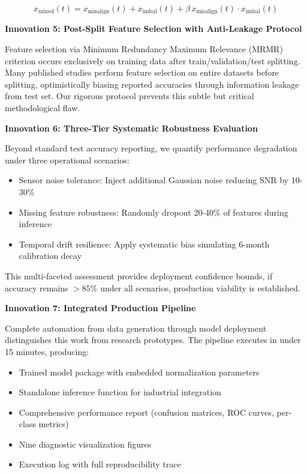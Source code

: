 \documentclass[11pt,a4paper]{article}
\begin{document}
\begin{equation}
x_{\text{mixed}}(t) = x_{\text{misalign}}(t) + x_{\text{imbal}}(t) + \beta \, x_{\text{misalign}}(t) \cdot x_{\text{imbal}}(t)
\end{equation}

\textbf{Innovation 5: Post-Split Feature Selection with Anti-Leakage Protocol}

Feature selection via Minimum Redundancy Maximum Relevance (MRMR) criterion occurs exclusively on training data after train/validation/test splitting. Many published studies perform feature selection on entire datasets before splitting, optimistically biasing reported accuracies through information leakage from test set. Our rigorous protocol prevents this subtle but critical methodological flaw.

\textbf{Innovation 6: Three-Tier Systematic Robustness Evaluation}

Beyond standard test accuracy reporting, we quantify performance degradation under three operational scenarios:
\begin{itemize}[itemsep=0.2em]
    \item Sensor noise tolerance: Inject additional Gaussian noise reducing SNR by 10-30\%
    \item Missing feature robustness: Randomly dropout 20-40\% of features during inference
    \item Temporal drift resilience: Apply systematic bias simulating 6-month calibration decay
\end{itemize}

This multi-faceted assessment provides deployment confidence bounds, if accuracy remains $ > 85\%$ under all scenarios, production viability is established.

\textbf{Innovation 7: Integrated Production Pipeline}

Complete automation from data generation through model deployment distinguishes this work from research prototypes. The pipeline executes in under 15 minutes, producing:
\begin{itemize}[itemsep=0.2em]
    \item Trained model package with embedded normalization parameters
    \item Standalone inference function for industrial integration
    \item Comprehensive performance report (confusion matrices, ROC curves, per-class metrics)
    \item Nine diagnostic visualization figures
    \item Execution log with full reproducibility trace
\end{itemize}
\end{document}

